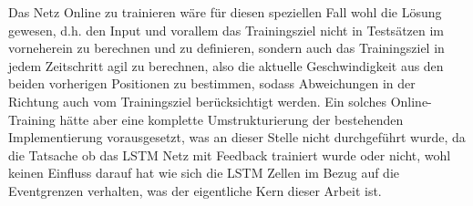 \begin{description}
	Das Netz Online zu trainieren wäre für diesen speziellen Fall wohl die Lösung gewesen, d.h. den Input und vorallem das Trainingsziel nicht in Testsätzen im vorneherein zu berechnen und zu definieren, sondern auch das Trainingsziel in jedem Zeitschritt agil zu berechnen, also die aktuelle Geschwindigkeit aus den beiden vorherigen Positionen zu bestimmen, sodass Abweichungen in der Richtung auch vom Trainingsziel berücksichtigt werden. Ein solches Online-Training hätte aber eine komplette Umstrukturierung der bestehenden Implementierung vorausgesetzt, was an dieser Stelle nicht durchgeführt wurde, da die Tatsache ob das LSTM Netz mit Feedback trainiert wurde oder nicht, wohl keinen Einfluss darauf hat wie sich die LSTM Zellen im Bezug auf die Eventgrenzen verhalten, was der eigentliche Kern dieser Arbeit ist. 
\end{description}

